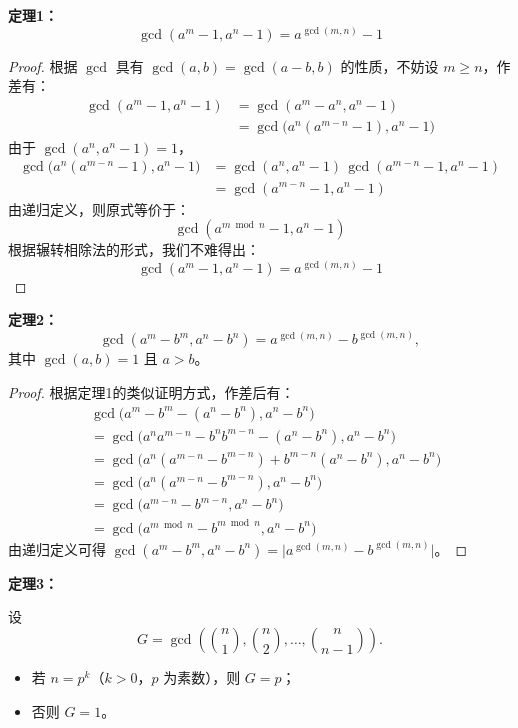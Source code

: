 \textbf{定理1：}
\[
\gcd(a^m - 1, a^n - 1) = a^{\gcd(m, n)} - 1
\]

\begin{proof}\leavevmode

根据 $\gcd$ 具有 $\gcd(a, b) = \gcd(a - b, b)$ 的性质，不妨设 $m \ge n$，作差有：
\[
\begin{aligned}
\gcd(a^m - 1, a^n - 1) &= \gcd(a^m - a^n, a^n - 1) \\
&= \gcd\bigl(a^n(a^{m - n} - 1), a^n - 1\bigr)
\end{aligned}
\]
由于 $\gcd(a^n, a^n - 1) = 1$，
\[
\begin{aligned}
\gcd\bigl(a^n(a^{m - n} - 1), a^n - 1\bigr)
&= \gcd(a^n, a^n - 1)\,\gcd(a^{m - n} - 1, a^n - 1) \\
&= \gcd(a^{m - n} - 1, a^n - 1)
\end{aligned}
\]
由递归定义，则原式等价于：
\[
\gcd(a^{m \bmod n} - 1, a^n - 1)
\]
根据辗转相除法的形式，我们不难得出：
\[
\gcd(a^m - 1, a^n - 1) = a^{\gcd(m, n)} - 1
\]

\end{proof}

\textbf{定理2：}
\[
\gcd(a^m - b^m, a^n - b^n) = a^{\gcd(m, n)} - b^{\gcd(m, n)},
\]
其中 $\gcd(a, b) = 1$ 且 $a > b$。

\begin{proof}\leavevmode

根据定理1的类似证明方式，作差后有：
\[
\begin{aligned}
&\gcd\bigl(a^m - b^m - (a^n - b^n), a^n - b^n\bigr) \\
&= \gcd\bigl(a^n a^{m-n} - b^n b^{m-n} - (a^n - b^n), a^n - b^n\bigr) \\
&= \gcd\bigl(a^n(a^{m-n} - b^{m-n}) + b^{m-n}(a^n - b^n), a^n - b^n\bigr) \\
&= \gcd\bigl(a^n(a^{m-n} - b^{m-n}), a^n - b^n\bigr) \\
&= \gcd\bigl(a^{m-n} - b^{m-n}, a^n - b^n\bigr) \\
&= \gcd\bigl(a^{m \bmod n} - b^{m \bmod n}, a^n - b^n\bigr)
\end{aligned}
\]
由递归定义可得 $\gcd(a^m - b^m, a^n - b^n) = \bigl| a^{\gcd(m, n)} - b^{\gcd(m, n)} \bigr|$。

\end{proof}

\textbf{定理3：}

设
\[
G = \gcd\left(\binom{n}{1}, \binom{n}{2}, \ldots, \binom{n}{n-1}\right).
\]
\begin{itemize}
\item 若 $n = p^k$（$k>0$，$p$ 为素数），则 $G = p$；
\item 否则 $G = 1$。
\end{itemize}

